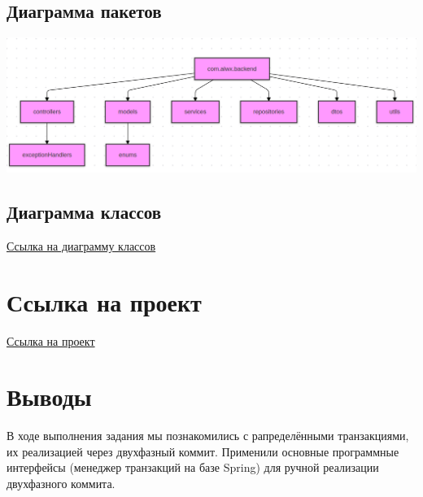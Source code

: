 \documentclass{article}
\begin{document}
    \subsection{Диаграмма пакетов}
        \begin{center}
            \includegraphics[width=.9\textwidth]{package_uml}
        \end{center}

\subsection{Диаграмма классов}
\href{https://www.mermaidchart.com/raw/7b97b9f2-bd1a-4381-be9d-0ba2c8f43344?theme=light&version=v0.1&format=svg}{Ссылка на диаграмму классов}

\section{Ссылка на проект}
\href{https://github.com/Alex-de-bug/Information-systems-itmo/tree/main/lab3spring}{Ссылка на проект}

\section{Выводы}
        В ходе выполнения задания мы познакомились с рапределёнными транзакциями, их реализацией через двухфазный коммит. Применили основные программные интерфейсы (менеджер транзакций на базе Spring) для ручной реализации двухфазного коммита.
\end{document}
